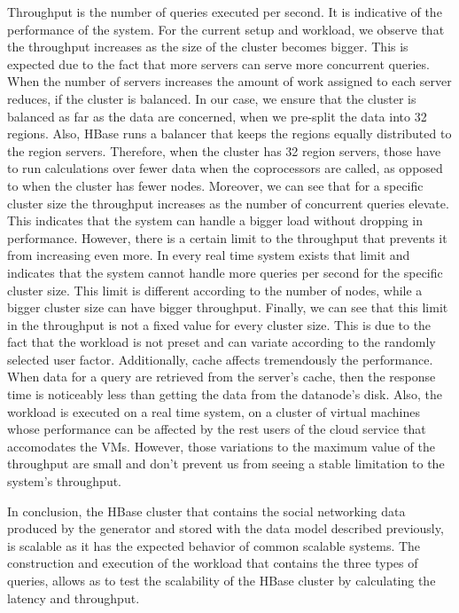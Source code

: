 Throughput is the number of queries executed per second. It is indicative of the performance of the system. For the current setup and workload, we observe that 
the throughput increases as the size of the cluster becomes bigger. This is expected due to the fact that more servers can serve more concurrent queries. 
When the number of servers increases the amount of work assigned to each server reduces, if the cluster is balanced. In our case, we ensure that the cluster 
is balanced as far as the data are concerned, when we pre-split the data into 32 regions. Also, HBase runs a balancer that keeps the regions equally 
distributed to the region servers. Therefore, when the cluster has 32 region servers, those have to run calculations over fewer data when the coprocessors are 
called, as opposed to when the cluster has fewer nodes. Moreover, we can see that for a specific cluster size the throughput increases as the number of 
concurrent queries elevate. This indicates that the system can handle a bigger load without dropping in performance. However, there is a certain limit to the 
throughput that prevents it from increasing even more. In every real time system exists that limit and indicates that the system cannot handle more queries per 
second for the specific cluster size. This limit is different according to the number of nodes, while a bigger cluster size can have bigger throughput. 
Finally, we can see that this limit in the throughput is not a fixed value for every cluster size. This is due to the fact that the workload is not preset and 
can variate according to the randomly selected user factor. Additionally, cache affects tremendously the performance. When data for a query are retrieved from 
the server's cache, then the response time is noticeably less than getting the data from the datanode's disk. Also, the workload is executed on a real time system, 
on a cluster of virtual machines whose performance can be affected by the rest users of the cloud service that accomodates the VMs. However, those variations to the 
maximum value of the throughput are small and don't prevent us from seeing a stable limitation to the system's throughput.

In conclusion, the HBase cluster that contains the social networking data produced by the generator and stored with the data model described previously, is 
scalable as it has the expected behavior of common scalable systems. 
The construction and execution of the workload that contains the three types of queries, allows as to test the scalability of the HBase cluster 
by calculating the latency and throughput. 





